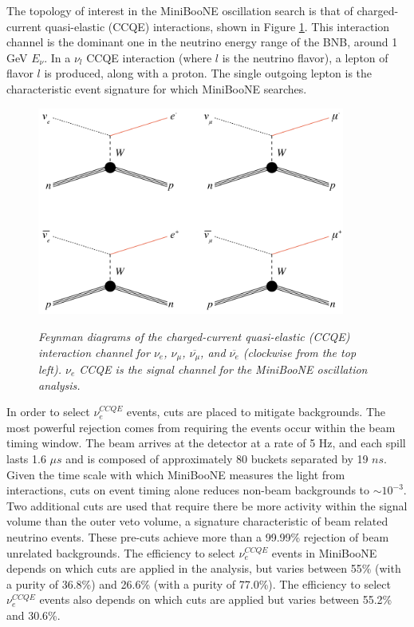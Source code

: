 The topology of interest in the MiniBooNE oscillation search is that of charged-current quasi-elastic (CCQE) interactions, shown in Figure \ref{georgia_ccqe_feynman_fig}. This interaction channel is the dominant one in the neutrino energy range of the BNB, around 1 GeV $E_\nu$. In a $\nu_l$ CCQE interaction (where $l$ is the neutrino flavor), a lepton of flavor $l$ is produced, along with a proton. The single outgoing lepton is the characteristic event signature for which MiniBooNE searches.\\


\begin{figure}[ht!]
\centering
	\includegraphics[width=0.9\textwidth]{Figures/georgia_ccqe_feynman.png} \\
\caption{\textit{Feynman diagrams of the charged-current quasi-elastic (CCQE) interaction channel for $\nu_e$, $\nu_\mu$, $\overline{\nu_\mu}$, and $\overline{\nu_e}$ (clockwise from the top left). $\nu_e$ CCQE is the signal channel for the MiniBooNE oscillation analysis.}}\label{georgia_ccqe_feynman_fig}
\end{figure}


In order to select $\nu_e^{CCQE}$ events, cuts are placed to mitigate backgrounds. The most powerful rejection comes from requiring the events occur within the beam timing window. The beam arrives at the detector at a rate of 5 Hz, and each spill lasts 1.6 $\mu s$ and is composed of approximately 80 buckets separated by 19 $ns$. Given the time scale with which MiniBooNE measures the light from interactions, cuts on event timing alone reduces non-beam backgrounds to $\sim10^{-3}$. Two additional cuts are used that require there be more activity within the signal volume than the outer veto volume, a signature characteristic of beam related neutrino events. These pre-cuts achieve more than a 99.99\% rejection of beam unrelated backgrounds. The efficiency to select $\nu_e^{CCQE}$ events in MiniBooNE depends on which cuts are applied in the analysis, but varies between 55\% (with a purity of 36.8\%) and 26.6\% (with a purity of 77.0\%)\cite{MB_numueff_source}. The efficiency to select $\nu_e^{CCQE}$ events also depends on which cuts are applied but varies between 55.2\% and 30.6\%\cite{MB_nueeff_source}.\\

